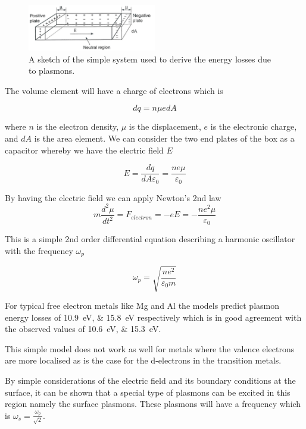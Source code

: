 \begin{figure}[htbp]
\centering
\includegraphics[width=0.5\textwidth]{figures/02_07}
\caption{A sketch of the simple system used to derive the energy losses due to plasmons.}
\label{fig:plasmon_derive}
\end{figure}
 
The volume element will have a charge of electrons which is

\begin{equation}
dq = n\mu edA
\end{equation}

where $n$ is the electron density, $\mu$ is the displacement, $e$ is the electronic charge, and $dA$ is the area element. We can consider the two end plates of the box as a capacitor whereby we have the electric field $E$

\begin{equation}
E = \frac{dq}{dA\varepsilon_{0}}=\frac{ne\mu}{\varepsilon_{0}}
\end{equation}


By having the electric field we can apply Newton's 2nd law
\begin{equation}
m\frac{d^{2}\mu}{dt^2}= F_{electron}=-eE=-\frac{ne^2\mu}{\varepsilon_0}
\end{equation}

This is a simple 2nd order differential equation describing a harmonic oscillator with the frequency $\omega_{p}$

\begin{equation}
\omega_p = \sqrt{\frac{ne^2}{\varepsilon_0 m}}
\end{equation}

For typical free electron metals like Mg and Al the models predict plasmon energy losses of \SIlist{10.9;15.8}{\electronvolt} respectively which is in good agreement with the observed values of \SIlist{10.6;15.3}{\electronvolt}.

This simple model does not work as well for metals where the valence electrons are more localised as is the case for the d-electrons in the transition metals.

By simple considerations of the electric field and its boundary conditions at the surface, it can be shown that a special type of plasmons can be excited in this region namely the surface plasmons. These plasmons will have a frequency which is $\omega_{s} = \frac{\omega_{p}}{\sqrt{2}}$.

